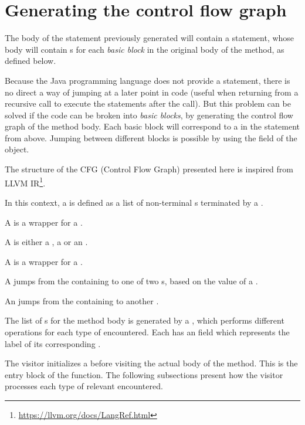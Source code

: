 \section{Generating the control flow graph}

The body of the  statement previously generated will contain a  statement, whose body will
contain s for each \textit{basic block} in the original body of the method, as defined below.

Because the Java programming language does not provide a  statement, there is no direct a way of jumping at
a later point in code (useful when returning from a recursive call to execute the statements after the call). But this
problem can be solved if the code can be broken into \textit{basic blocks}, by generating the control flow graph of the
method body. Each basic block will correspond to a  in the  statement from above. Jumping
between different blocks is possible by using the  field of the  object.

The structure of the CFG (Control Flow Graph)  presented here is inspired from LLVM
IR\footnote{\url{https://llvm.org/docs/LangRef.html}}.

In this context, a  is defined as a list of non-terminal s terminated by a
.

A  is a wrapper for a .

A  is either a , a  or an
.

A  is a wrapper for a .

A  jumps from the containing  to one of two s, based on the
value of a .

An  jumps from the containing  to another .

The list of s for the method body is generated by a , which performs
different operations for each type of  encountered. Each  has an  field which
represents the label of its corresponding .

The visitor initializes a  before visiting the actual body of the method. This is the entry block of
the function. The following subsections present how the visitor processes each type of relevant 
encountered.


